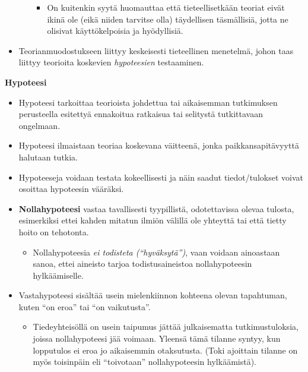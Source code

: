 \documentclass[
]{book}
\providecommand{\tightlist}{%
  \setlength{\itemsep}{0pt}\setlength{\parskip}{0pt}}
\begin{document}
\begin{defblock}{}
\begin{itemize}
\begin{itemize}
    \begin{itemize}
    \tightlist
    \item
      On kuitenkin syytä huomauttaa että tieteellisetkään teoriat eivät ikinä ole (eikä niiden tarvitse olla) täydellisen täsmällisiä, jotta ne olisivat käyttökelpoisia ja hyödyllisiä.
    \end{itemize}
  \end{itemize}
\item
  Teorianmuodostukseen liittyy keskeisesti tieteellinen menetelmä, johon taas liittyy teorioita koskevien \emph{hypoteesien} testaaminen.
\end{itemize}

\end{defblock}

\hfill\break

\begin{defblock}{}

\textbf{Hypoteesi}

\begin{itemize}
\tightlist
\item
  Hypoteesi tarkoittaa teorioista johdettua tai aikaisemman tutkimuksen perusteella esitettyä ennakoitua ratkaisua tai selitystä tutkittavaan ongelmaan.
\item
  Hypoteesi ilmaistaan teoriaa koskevana väitteenä, jonka paikkansapitävyyttä halutaan tutkia.
\item
  Hypoteeseja voidaan testata kokeellisesti ja näin saadut tiedot/tulokset voivat osoittaa hypoteesin vääräksi.
\item
  \textbf{Nollahypoteesi} vastaa tavallisesti tyypillistä, odotettavissa olevaa tulosta, esimerkiksi ettei kahden mitatun ilmiön välillä ole yhteyttä tai että tietty hoito on tehotonta.

  \begin{itemize}
  \tightlist
  \item
    Nollahypoteesia \emph{ei todisteta (``hyväksytä'')}, vaan voidaan ainoastaan sanoa, ettei aineisto tarjoa todistusaineistoa nollahypoteesin hylkäämiselle.
  \end{itemize}
\item
  Vastahypoteesi sisältää usein mielenkiinnon kohteena olevan tapahtuman, kuten ``on eroa'' tai ``on vaikutusta''.

  \begin{itemize}
  \tightlist
  \item
    Tiedeyhteisöllä on usein taipumus jättää julkaisematta tutkimustuloksia, joissa nollahypoteesi jää voimaan. Yleensä tämä tilanne syntyy, kun lopputulos ei eroa jo aikaisemmin otaksutusta. (Toki ajoittain tilanne on myös toisinpäin eli ``toivotaan'' nollahypoteesin hylkäämistä).
  \end{itemize}
\end{itemize}

\end{defblock}
\end{document}
